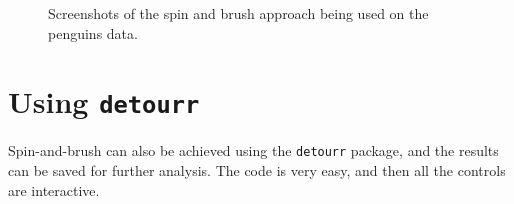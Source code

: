 \documentclass[
  letterpaper,
]{book}
\begin{document}
\begin{figure}
\begin{minipage}[t]{0.50\linewidth}
{

}

\subcaption{\label{fig-penguins-bs2}}
\end{minipage}%

\caption{\label{fig-penguins-bs-static}Screenshots of the spin and brush
approach being used on the penguins data.}

\end{figure}

\hypertarget{using-detourr-1}{%
\section{\texorpdfstring{Using
\texttt{detourr}}{Using detourr}}\label{using-detourr-1}}

Spin-and-brush can also be achieved using the \texttt{detourr} package,
and the results can be saved for further analysis. The code is very
easy, and then all the controls are interactive.
\end{document}
